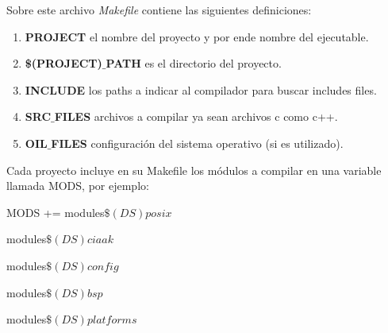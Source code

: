 \documentclass[12pt,letterpaper]{article}
\begin{document}
Sobre este archivo \textit{Makefile} contiene las siguientes definiciones:

\begin{enumerate}
\item \textbf{PROJECT} el nombre del proyecto y por ende nombre del ejecutable.
\item \textbf{\$(PROJECT)$\_$PATH} es el directorio del proyecto.
\item \textbf{INCLUDE} los paths a indicar al compilador para buscar includes files.
\item \textbf{SRC$\_$FILES} archivos a compilar ya sean archivos c como c++.
\item \textbf{OIL$\_$FILES} configuración del sistema operativo (si es utilizado).
\end{enumerate}
Cada proyecto incluye en su Makefile los módulos a compilar en una variable llamada MODS, por ejemplo:

MODS += modules$\$(DS)posix$ \  

        modules$\$(DS)ciaak $\  
        
        modules$\$(DS)config$ \  
        
        modules$\$(DS)bsp $\	
        
        modules$\$(DS)platforms$
 \\
\end{document}
